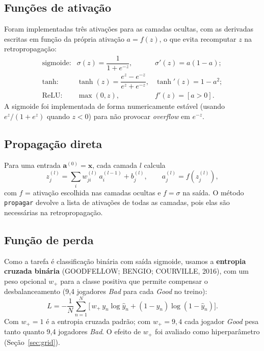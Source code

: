 \documentclass[11pt,a4paper]{article}
\begin{document}
\subsection{Funções de ativação}
Foram implementadas três ativações para as camadas ocultas, com as derivadas escritas em função da própria
ativação $a = f(z)$, o que evita recomputar $z$ na retropropagação:
\[
\begin{array}{lll}
\text{sigmoide:} & \sigma(z) = \dfrac{1}{1+e^{-z}}, & \sigma'(z) = a(1-a);\\[8pt]
\text{tanh:} & \tanh(z) = \dfrac{e^{z}-e^{-z}}{e^{z}+e^{-z}}, & \tanh'(z) = 1-a^2;\\[8pt]
\text{ReLU:} & \max(0, z), & f'(z) = [a>0].
\end{array}
\]
A sigmoide foi implementada de forma numericamente estável (usando $e^{z}/(1+e^{z})$ quando $z<0$) para não
provocar \emph{overflow} em $e^{-z}$.

\subsection{Propagação direta}
Para uma entrada $\mathbf{a}^{(0)} = \mathbf{x}$, cada camada $l$ calcula
\[
  z^{(l)}_j = \sum_i w^{(l)}_{ji}\, a^{(l-1)}_i + b^{(l)}_j, \qquad a^{(l)}_j = f\!\left(z^{(l)}_j\right),
\]
com $f$ = ativação escolhida nas camadas ocultas e $f = \sigma$ na saída. O método \texttt{propagar}
devolve a lista de ativações de todas as camadas, pois elas são necessárias na retropropagação.

\subsection{Função de perda}
Como a tarefa é classificação binária com saída sigmoide, usamos a \textbf{entropia cruzada binária}
(GOODFELLOW; BENGIO; COURVILLE, 2016), com um
peso opcional $w_+$ para a classe positiva que permite compensar o desbalanceamento (9,4 jogadores \emph{Bad}
para cada \emph{Good} no treino):
\[
  L = -\frac{1}{N}\sum_{n=1}^{N}\Big[\, w_+\, y_n \log \hat y_n + (1-y_n)\log(1-\hat y_n) \Big].
\]
Com $w_+ = 1$ é a entropia cruzada padrão; com $w_+ = 9{,}4$ cada jogador \emph{Good} pesa tanto quanto
9,4 jogadores \emph{Bad}. O efeito de $w_+$ foi avaliado como hiperparâmetro (Seção~\ref{sec:grid}).
\end{document}
